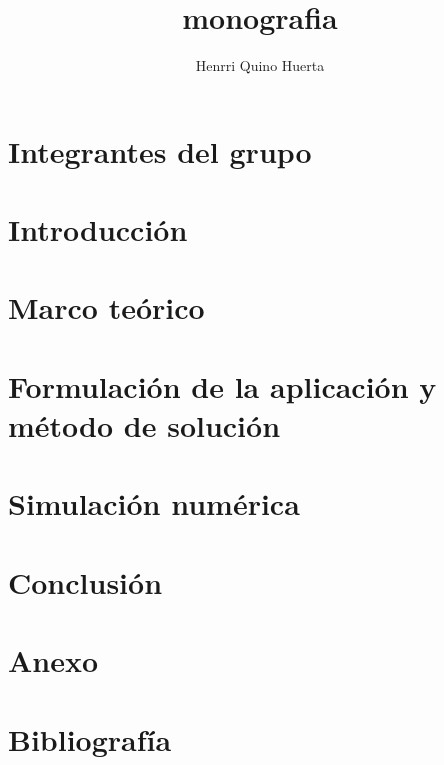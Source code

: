 \documentclass[11pt,a4paper,openany]{book}
\author{Henrri Quino Huerta}
\title{monografia}
\begin{document}
		\frontmatter
		 
		\chapter*{Integrantes del grupo}
		
		\tableofcontents
		\mainmatter
		\chapter*{Introducción}
		
		\chapter{Marco teórico}
		
		\chapter{Formulación de la aplicación y método de solución}
		
		\chapter{Simulación numérica}
		
		\chapter{Conclusión}
		
		\backmatter
		\chapter{Anexo}
		
		\chapter{Bibliografía}
		
\end{document}
